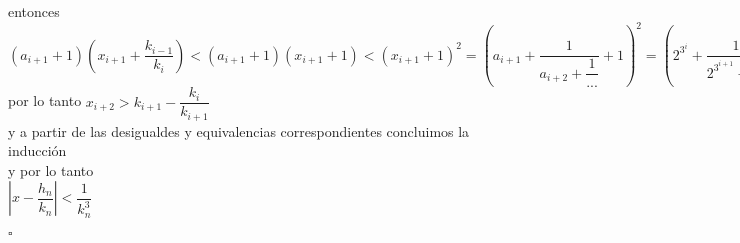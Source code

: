 \documentclass[11pt, article]{memoir}
\begin{document}
entonces\\
$(a_{i+1}+1)(x_{i+1}+\dfrac{k_{i-1}}{k_{i}})<(a_{i+1}+1)(x_{i+1}+1)<(x_{i+1}+1)^{2}=\left(a_{i+1}+\dfrac{1}{a_{i+2}+\dfrac{1}{...}}+1\right)^{2}=\left(2^{3^{i}}+\dfrac{1}{2^{3^{i+1}}+\dfrac{1}{...}}+1\right)^{2}<2^{3^{i+1}}+\dfrac{1}{2^{3^{i+2}}+\dfrac{1}{...}}=x_{n+1}$\\
por lo tanto $x_{i+2}>k_{i+1}-\dfrac{k_{i}}{k_{i+1}}$\\
y a partir de las desigualdes y equivalencias correspondientes concluimos la inducción\\
y por lo tanto\\
$\left|x-\dfrac{h_{n}}{k_{n}}\right|<\dfrac{1}{k_{n}^{3}}$\\
\begin{flushright}
$\square$
\end{flushright}
\end{document}
